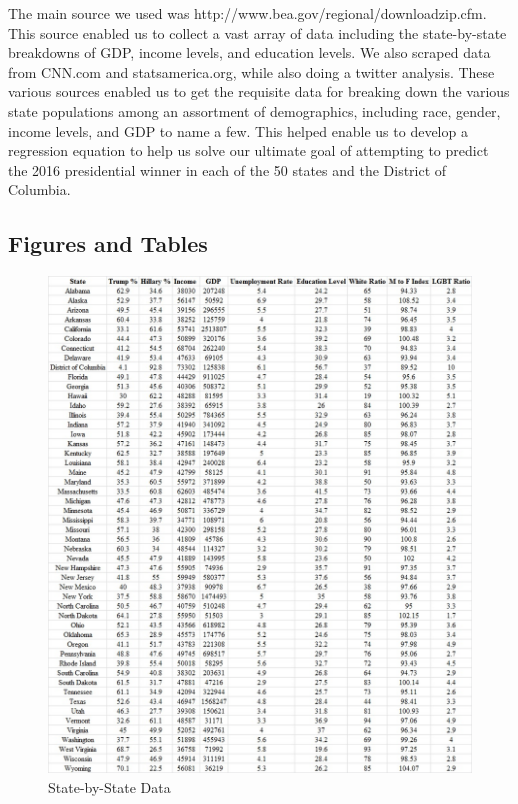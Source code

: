 \documentclass{article}
\begin{document}
{The main source we used was http://www.bea.gov/regional/downloadzip.cfm. This source enabled us to collect a vast array of data including the state-by-state breakdowns of GDP, income levels, and education levels. We also scraped data from CNN.com and statsamerica.org, while also doing a twitter analysis. These various sources enabled us to get the requisite data for breaking down the various state populations among an assortment of demographics, including race, gender, income levels, and GDP to name a few. This helped enable us to develop a regression equation to help us solve our ultimate goal of attempting to predict the 2016 presidential winner in each of the 50 states and the District of Columbia.

\subsection{Figures and Tables}
%
%


%

\begin{figure}[!h]
 \centering
   \includegraphics[scale=0.5]{DataTable}
  \caption{State-by-State Data}
\end{figure}  

}
\end{document}
